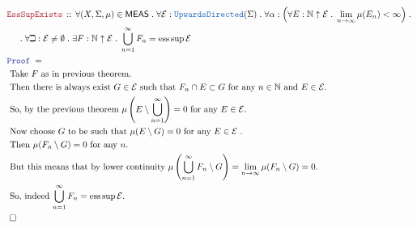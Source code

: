 \documentclass[12pt]{scrartcl}
\newcommand{\TYPE}[1]{\textcolor{NavyBlue}{\mathtt{#1}}}
\newcommand{\LOGIC}[1]{\textcolor{Blue}{\mathtt{#1}}}
\newcommand{\THM}[1]{\textcolor{Maroon}{\mathtt{#1}}}
\renewcommand{\.}{\; . \;}
\newcommand{\Theorem}[2]{& \THM{#1} \, :: \, #2 \\ & \Proof = \\ }
\newcommand{\NewLine}{\\ & \kern 1pc}
\newcommand{\Page}[1]{ \begin{align*} #1 \end{align*}   }
\newcommand{\Nat}{\mathbb{N} }
\newcommand{\QED}{\; \square}
\newcommand{\EndProof}{& \QED \\}
\newcommand{\Proof}{\LOGIC{Proof} \; }
\newcommand{\Explain}[1]{& \text{#1.} \\}
\DeclareMathOperator{\esssup}{ess\sup}
\newcommand{\E}{\mathcal{E}}
\newcommand{\MEAS}{\mathsf{MEAS}}
\begin{document}
\Page{
		\Theorem{EssSupExists}
	{
		\forall (X,\Sigma,\mu) \in \MEAS \.
		\forall \E  : \TYPE{UpwardsDirected}( \Sigma ) \.
		\forall \alpha : \Big(\forall E : \Nat \uparrow \E \.
		\lim_{n \to \infty} \mu(E_n) < \infty \Big) \.
		 \NewLine \.
		\forall \beth : \E \neq \emptyset \.
		\exists F : \Nat \uparrow \E \.
		\bigcup^\infty_{n=1} F_n = \esssup \E
	}
	\Explain{
		Take $F$ as in previous theorem}
	\Explain{
		Then there is always exist $G \in \E$ such that $F_n \cap E \subset G$ 
		for any $n \in \Nat$ and $E \in \E$}
	\Explain{ 
		So, by the previous theorem $\mu\left(E \setminus \bigcup^\infty_{n=1}  \right) = 0$ for any $E \in \E$}
	\Explain{
		Now choose $G$ to be such that $\mu(E \setminus G) = 0$ for any $E \in \E$
	}
	\Explain{
		Then $\mu(F_n \setminus G) =0$ for any $n$}
	\Explain{
		But this means that by lower continuity 
		$\mu\left( \bigcup^\infty_{n=1} F_n \setminus G\right) = \lim_{n \to \infty} \mu(F_n \setminus G) = 0$}
	\Explain{
		So, indeed $\bigcup^\infty_{n=1} F_n = \esssup \E$}
	\EndProof
}
\newpage
\end{document}
